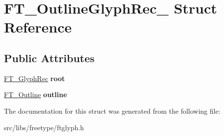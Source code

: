 \hypertarget{struct_f_t___outline_glyph_rec__}{
\section{FT\_\-OutlineGlyphRec\_\- Struct Reference}
\label{struct_f_t___outline_glyph_rec__}
}
\subsection*{Public Attributes}
\begin{DoxyCompactItemize}
\item 
\hypertarget{struct_f_t___outline_glyph_rec___a71e5a8d5fe69e0cea68c96486dd6713f}{
\hyperlink{struct_f_t___glyph_rec__}{FT\_\-GlyphRec} {\bfseries root}}
\label{struct_f_t___outline_glyph_rec___a71e5a8d5fe69e0cea68c96486dd6713f}

\item 
\hypertarget{struct_f_t___outline_glyph_rec___af1bd473a32fcbc500edcfcf89e3ac8ac}{
\hyperlink{struct_f_t___outline__}{FT\_\-Outline} {\bfseries outline}}
\label{struct_f_t___outline_glyph_rec___af1bd473a32fcbc500edcfcf89e3ac8ac}

\end{DoxyCompactItemize}


The documentation for this struct was generated from the following file:\begin{DoxyCompactItemize}
\item 
src/libs/freetype/ftglyph.h\end{DoxyCompactItemize}
